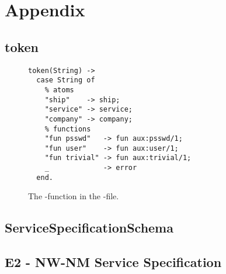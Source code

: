 \chapter{Appendix}

\section{token}
\begin{figure}[h]
  \begin{lstlisting}
token(String) ->
  case String of
    % atoms
    "ship"    -> ship;
    "service" -> service;
    "company" -> company;
    % functions
    "fun psswd"   -> fun aux:psswd/1;
    "fun user"    -> fun aux:user/1;
    "fun trivial" -> fun aux:trivial/1;
    _             -> error
  end.
  \end{lstlisting}
  \caption{The -function in the -file.}
\end{figure}
\newpage
\section{ServiceSpecificationSchema}

\section{E2 - NW-NM Service Specification}

